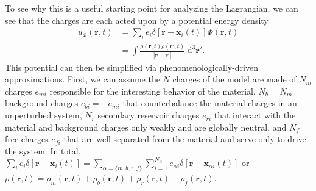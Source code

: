 \documentclass{article}
\begin{document}
To see why this is a useful starting point for analyzing the Lagrangian, we can see that the charges are each acted upon by a potential energy density
\begin{equation}
\begin{split}
u_\Phi(\mathbf{r},t) &= \sum_ie_i\delta[\mathbf{r} - \mathbf{x}_i(t)]\Phi(\mathbf{r},t)\\
&= \int\frac{\rho(\mathbf{r},t)\rho(\mathbf{r}',t)}{|\mathbf{r} - \mathbf{r}'|}\;\mathrm{d}^3\mathbf{r}'.
\end{split}
\end{equation}
This potential can then be simplified via phenomenologically-driven approximations. First, we can assume the $N$ charges of the model are made of $N_m$ charges $e_{mi}$ responsible for the interesting behavior of the material, $N_b = N_m$ background charges $e_{bi} = -e_{mi}$ that counterbalance the material charges in an unperturbed system, $N_r$ secondary reservoir charges $e_{ri}$ that interact with the material and background charges only weakly and are globally neutral, and $N_f$ free charges $e_{fi}$ that are well-separated from the material and serve only to drive the system. In total, $\sum_ie_i\delta[\mathbf{r} - \mathbf{x}_i(t)] = \sum_{\alpha = \{m,b,r,f\}}\sum_{i = 1}^{N_\alpha}e_{\alpha i}\delta[\mathbf{r} - \mathbf{x}_{\alpha i}(t)]$ or $\rho(\mathbf{r},t) = \rho_m(\mathbf{r},t) + \rho_b(\mathbf{r},t) + \rho_r(\mathbf{r},t) + \rho_f(\mathbf{r},t)$.
\end{document}
